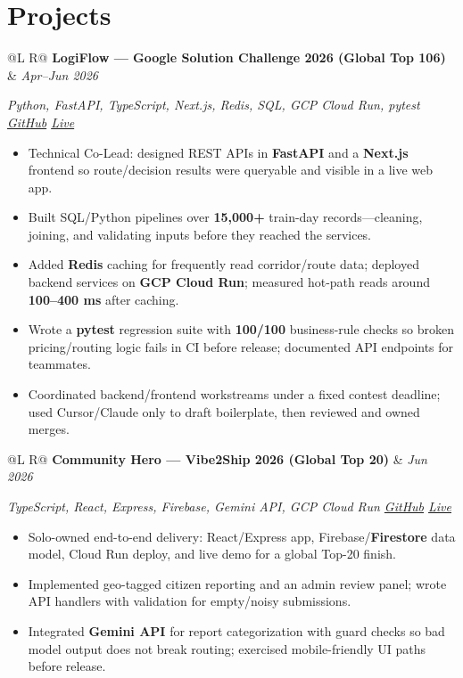\documentclass[a4paper,10pt]{article}
\makeatletter
\newcommand{\proj}[3]{%
  \vspace{1.5mm}
  \noindent\begin{tabularx}{\textwidth}{@{}L R@{}}
    \textbf{#1} & \textit{\small #2} \\
  \end{tabularx}\par
  {\small\textit{#3}}\par
  \vspace{0.5mm}%
}
\makeatother
\begin{document}
\section{Projects}
\proj{LogiFlow --- Google Solution Challenge 2026 (Global Top 106)}{Apr--Jun 2026}
{Python, FastAPI, TypeScript, Next.js, Redis, SQL, GCP Cloud Run, pytest \textbar{} \href{https://github.com/Ojas-Srivastava05/LogiFlow-Solution-Challenge-2026}{GitHub} \textbar{} \href{https://logi-flow-solution-challenge-2026.vercel.app}{Live}}
\begin{itemize}
  \item Technical Co-Lead: designed REST APIs in \textbf{FastAPI} and a \textbf{Next.js} frontend so route/decision results were queryable and visible in a live web app.
  \item Built SQL/Python pipelines over \textbf{15,000+} train-day records---cleaning, joining, and validating inputs before they reached the services.
  \item Added \textbf{Redis} caching for frequently read corridor/route data; deployed backend services on \textbf{GCP Cloud Run}; measured hot-path reads around \textbf{100--400 ms} after caching.
  \item Wrote a \textbf{pytest} regression suite with \textbf{100/100} business-rule checks so broken pricing/routing logic fails in CI before release; documented API endpoints for teammates.
  \item Coordinated backend/frontend workstreams under a fixed contest deadline; used Cursor/Claude only to draft boilerplate, then reviewed and owned merges.
\end{itemize}

\proj{Community Hero --- Vibe2Ship 2026 (Global Top 20)}{Jun 2026}
{TypeScript, React, Express, Firebase, Gemini API, GCP Cloud Run \textbar{} \href{https://github.com/Ojas-Srivastava05/community-hero}{GitHub} \textbar{} \href{https://community-hero-987477089222.asia-south1.run.app}{Live}}
\begin{itemize}
  \item Solo-owned end-to-end delivery: React/Express app, Firebase/\textbf{Firestore} data model, Cloud Run deploy, and live demo for a global Top-20 finish.
  \item Implemented geo-tagged citizen reporting and an admin review panel; wrote API handlers with validation for empty/noisy submissions.
  \item Integrated \textbf{Gemini API} for report categorization with guard checks so bad model output does not break routing; exercised mobile-friendly UI paths before release.
\end{itemize}
\end{document}
